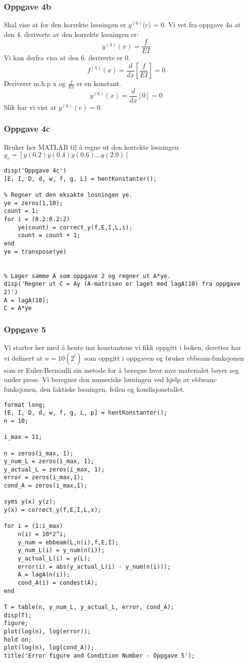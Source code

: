 \subsubsection{Oppgave 4b}
Skal vise at for den korrekte løsningen er $y^{(6)}$(c) = 0. Vi vet fra oppgave 4a at den 4. deriverte av den korrekte løsningen er:
\begin{equation*}
y^{(4)}(x) = \frac{f}{EI}
\end{equation*}
Vi kan derfra visa at den 6. deriverte er 0.
\begin{equation}
f^{(5)}(x) = \frac{d}{dx}[\frac{f}{EI}] = 0
\end{equation}
Deriverer m.h.p x og $\frac{f}{EI}$ er en konstant.
\begin{equation}
y^{(6)}(x) = \frac{d}{dx}[0] = 0
\end{equation}
Slik har vi vist at $y^{(6)}(c) = 0$.

\subsubsection{Oppgave 4c}
Bruker her MATLAB til å regne ut den korrekte løsningen $y_e = [y(0.2) y(0.4) y(0.6) ... y(2.0)]$ 
\begin{lstlisting}
disp('Oppgave 4c')
[E, I, D, d, w, f, g, L] = hentKonstanter();

% Regner ut den eksakte losningen ye.
ye = zeros(1,10);
count = 1;
for i = (0.2:0.2:2)
    ye(count) = correct_y(f,E,I,L,i);
    count = count + 1;
end
ye = transpose(ye)


% Lager samme A som oppgave 2 og regner ut A*ye.
disp('Regner ut C = Ay (A-matrisen er laget med lagA(10) fra oppgave 2)')
A = lagA(10);
C = A*ye
\end{lstlisting}
\subsubsection{Oppgave 5}
Vi starter her med å hente inn konstantene vi fikk oppgitt i boken, deretter har vi definert at $n=10(2^{i})$ som oppgitt i oppgaven og bruker ebbeam-funksjonen som er 
Euler-Bernoulli sin metode for å beregne hvor mye materialet bøyer seg under press. 
Vi beregner den numeriske løsningen ved hjelp av ebbeam-funksjonen, den faktiske løsningen, feilen og kondisjonstallet. 
\begin{lstlisting}
format long;
[E, I, D, d, w, f, g, L, p] = hentKonstanter();
n = 10;

i_max = 11;

n = zeros(i_max, 1);
y_num_L = zeros(i_max, 1);
y_actual_L = zeros(i_max, 1);
error = zeros(i_max,1);
cond_A = zeros(i_max,1);

syms y(x) y(z);
y(x) = correct_y(f,E,I,L,x);

for i = (1:i_max)
    n(i) = 10*2^i;
    y_num = ebbeam(L,n(i),f,E,I);
    y_num_L(i) = y_num(n(i));
    y_actual_L(i) = y(L);
    error(i) = abs(y_actual_L(i) - y_num(n(i)));
    A = lagA(n(i));
    cond_A(i) = condest(A);
end

T = table(n, y_num_L, y_actual_L, error, cond_A);
disp(T);
figure;
plot(log(n), log(error));
hold on;
plot(log(n), log(cond_A));
title('Error figure and Condition Number - Oppgave 5');
\end{lstlisting}

